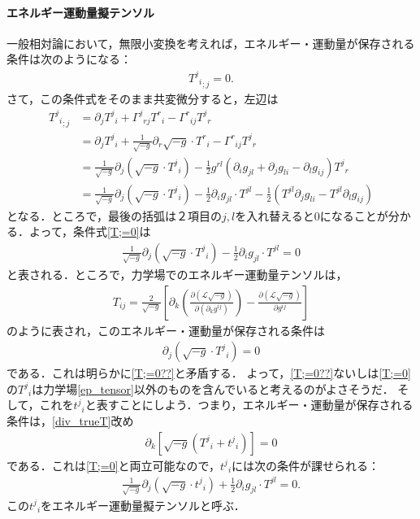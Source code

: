\documentclass[a4paper]{ltjsreport}
\begin{document}
\paragraph{エネルギー運動量擬テンソル}
一般相対論において，無限小変換を考えれば，エネルギー・運動量が保存される条件は次のようになる：
\begin{align}
  {{T^j}_i}_{;j}=0.\label{T;=0}
\end{align}
さて，この条件式をそのまま共変微分すると，左辺は
\begin{align*}
  {{T^j}_i}_{;j} &= \partial_j{T^j}_i + {\Gamma^j}_{rj}{T^r}_i - {\Gamma^r}_{ij}{T^j}_r\\
  &= \partial_j{T^j}_i + \frac{1}{\sqrt{ - g}}\partial_r\sqrt{ - g}\cdot{T^r}_i - {\Gamma^r}_{ij}{T^j}_r\\
  &= \frac{1}{\sqrt{ - g}}\partial_j\left(\sqrt{ - g}\cdot{T^j}_i\right) - \frac{1}{2}g^{rl}\left(\partial_ig_{jl} + \partial_jg_{li} - \partial_lg_{ij}\right){T^j}_r\\
  &= \frac{1}{\sqrt{ - g}}\partial_j\left(\sqrt{ - g}\cdot{T^j}_i\right) - \frac{1}{2}\partial_ig_{jl}\cdot{}T^{jl} - \frac{1}{2}\left(T^{jl}\partial_jg_{li} - T^{jl}\partial_lg_{ij}\right)
\end{align*}
となる．ところで，最後の括弧は２項目の$j, l$を入れ替えると0になることが分かる．よって，条件式\eqref{T;=0}は
\begin{align}
  \frac{1}{\sqrt{ - g}}\partial_j\left(\sqrt{ - g}\cdot{T^j}_i\right) - \frac{1}{2}\partial_ig_{jl}\cdot{}T^{jl}=0\label{T;=0??}
\end{align}
と表される．ところで，力学場でのエネルギー運動量テンソルは，
\begin{align}
  T_{ij}=\frac{2}{\sqrt{ - g}}\left[\partial_k\left(\frac{\partial{}(\mathcal{L}\sqrt{ - g})}{\partial(\partial_k{g^{ij}})}\right) - \frac{\partial(\mathcal{L}\sqrt{ - g})}{\partial{g^{ij}}}\right]
  \label{ep_tensor}
\end{align}
のように表され，このエネルギー・運動量が保存される条件は
\begin{align}
  \partial_j\left(\sqrt{ - g}\cdot{T^j}_i\right)=0\label{div_trueT}
\end{align}
である．これは明らかに\eqref{T;=0??}と矛盾する．
よって，\eqref{T;=0??}ないしは\eqref{T;=0}の${T^j}_i$は力学場\eqref{ep_tensor}以外のものを含んでいると考えるのがよさそうだ．
そして，これを${t^j}_i$と表すことにしよう．つまり，エネルギー・運動量が保存される条件は，\eqref{div_trueT}改め
\begin{align}
  \partial_k\left[\sqrt{ - g}({T^j}_i + {t^j}_i)\right]=0
\end{align}
である．これは\eqref{T;=0}と両立可能なので，${t^j}_i$には次の条件が課せられる：
\begin{align}
  \frac{1}{\sqrt{ - g}}\partial_j\left(\sqrt{ - g}\cdot{t^j}_i\right) + \frac{1}{2}\partial_ig_{jl}\cdot{}T^{jl}=0.\label{pseudo_Eptenosr}
\end{align}
この${t^j}_i$をエネルギー運動量擬テンソルと呼ぶ．
\end{document}

